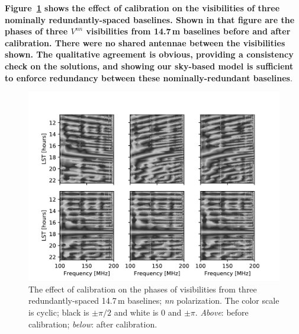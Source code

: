 \documentclass[twocolumn, trackchanges]{aastex61}
\newcommand{\edited}[1]{{\bf \color{red} #1}}
\begin{document}
\edited{
Figure~\ref{fig:phasecal} shows the effect of calibration on the visibilities of three nominally redundantly-spaced baselines.  Shown in that figure are the phases of three $V^{nn}$ visibilities from 14.7\,m baselines before and after calibration. There were no shared antennae between the visibilities shown. The qualitative agreement is obvious, providing a consistency check on the solutions, and showing our sky-based model is 
sufficient to enforce redundancy between these nominally-redundant baselines}.

\begin{figure}
\centering
\includegraphics[scale=0.6]{phases_pre_post_abscal_h19_cyclic_grey.pdf}
\caption{The effect of calibration on the phases of visibilities from three redundantly-spaced 14.7\,m baselines; \textit{nn} polarization. The color scale is cyclic; black is $\pm\pi/2$ and white is 0 and $\pm\pi$. \textit{Above}: before calibration; \textit{below}: after calibration.}
\label{fig:phasecal}
\end{figure}
\end{document}
